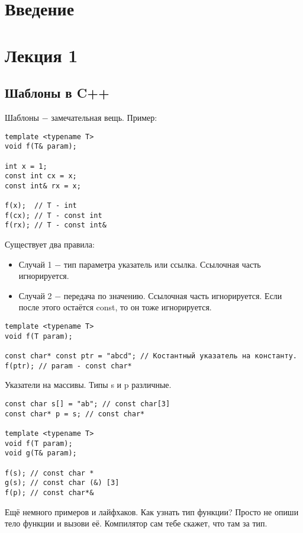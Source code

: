 \documentclass[a4paper, 12pt, titlepage, finall]{extreport}
\begin{document}
    \chapter*{Введение}
    \chapter{Лекция 1}
        \section{Шаблоны в C++}
            Шаблоны $-$ замечательная вещь. Пример:
\begin{lstlisting}
template <typename T>
void f(T& param);

int x = 1;
const int cx = x;
const int& rx = x;

f(x);  // T - int
f(cx); // T - const int
f(rx); // T - const int&
\end{lstlisting}
            Существует два правила:
            \begin{itemize}
                \item Случай 1 $-$ тип параметра указатель или ссылка. Ссылочная часть игнорируется.
                \item Случай 2 $-$ передача по значению. Ссылочная часть игнорируется. Если после этого остаётся const, то он тоже игнорируется.
            \end{itemize}
\begin{lstlisting}
template <typename T>
void f(T param);

const char* const ptr = "abcd"; // Костантный указатель на константу.
f(ptr); // param - const char*
\end{lstlisting}

            Указатели на массивы. Типы s и p различные.

\begin{lstlisting}
const char s[] = "ab"; // const char[3]
const char* p = s; // const char*

template <typename T>
void f(T param);
void g(T& param);

f(s); // const char *
g(s); // const char (&) [3]
f(p); // const char*&
\end{lstlisting}

            Ещё немного примеров и лайфхаков. Как узнать тип функции? Просто не опиши тело функции и вызови её.
            Компилятор сам тебе скажет, что там за тип.
\end{document}
